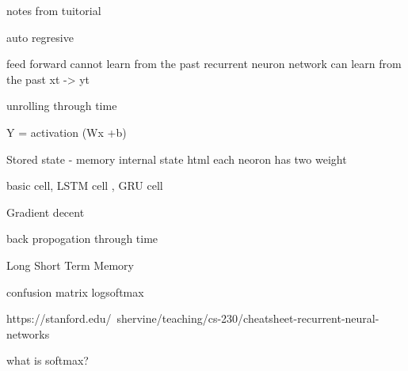 notes from tuitorial

auto regresive

feed forward cannot learn from the past
recurrent neuron network can learn from the past
xt -> yt 

unrolling through time


Y = activation (Wx +b)


Stored state - memory
internal state html
each neoron has two weight 


basic cell, LSTM cell , GRU cell 

Gradient decent 

back propogation through time

Long Short Term Memory 





confusion matrix
logsoftmax

https://stanford.edu/~shervine/teaching/cs-230/cheatsheet-recurrent-neural-networks


what is softmax?

